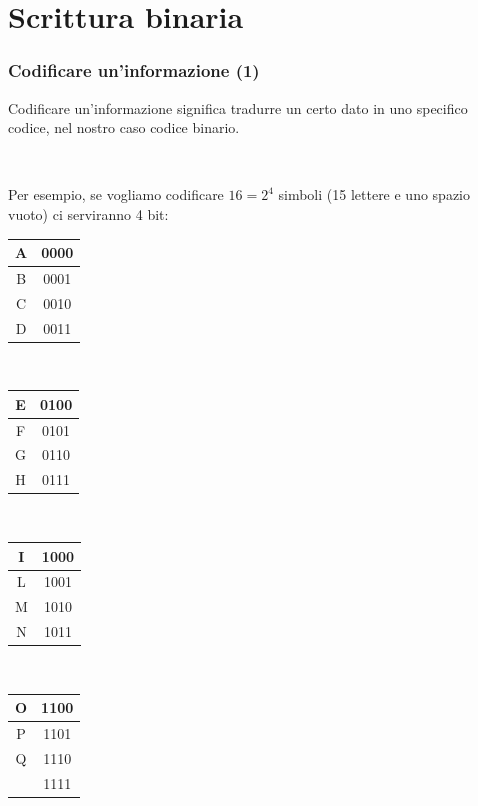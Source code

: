 \documentclass[handout]{beamer}
\begin{document}


\section{Scrittura binaria}


\begin{frame}
\frametitle{Codificare un'informazione (1)}
Codificare un'informazione significa tradurre un certo dato in uno specifico codice, nel nostro caso \alert<1>{codice binario}.\pause

~

Per esempio, se vogliamo codificare $ 16 = 2^4 $ simboli (15 lettere e uno spazio vuoto) ci serviranno 4 bit:
\begin{table}[htp]\centering
  \begin{tabular}{|c|c|}\hline\rule{0pt}{3ex}
    A & 0000 \\\hline\rule{0pt}{3ex}
    B & 0001 \\\hline\rule{0pt}{3ex}
    C & 0010 \\\hline\rule{0pt}{3ex}
    D & 0011 \\\hline
  \end{tabular}~~~~
  \begin{tabular}{|c|c|}\hline\rule{0pt}{3ex}
    E & 0100 \\\hline\rule{0pt}{3ex}
    F & 0101 \\\hline\rule{0pt}{3ex}
    G & 0110 \\\hline\rule{0pt}{3ex}
    H & 0111 \\\hline
  \end{tabular}~~~~
  \begin{tabular}{|c|c|}\hline\rule{0pt}{3ex}
    I & 1000 \\\hline\rule{0pt}{3ex}
    L & 1001 \\\hline\rule{0pt}{3ex}
    M & 1010 \\\hline\rule{0pt}{3ex}
    N & 1011 \\\hline
  \end{tabular}~~~~
  \begin{tabular}{|c|c|}\hline\rule{0pt}{3ex}
    O & 1100 \\\hline\rule{0pt}{3ex}
    P & 1101 \\\hline\rule{0pt}{3ex}
    Q & 1110 \\\hline\rule{0pt}{3ex}
    \textvisiblespace & 1111 \\\hline
  \end{tabular}
  \end{table}
\end{frame}
\end{document}
